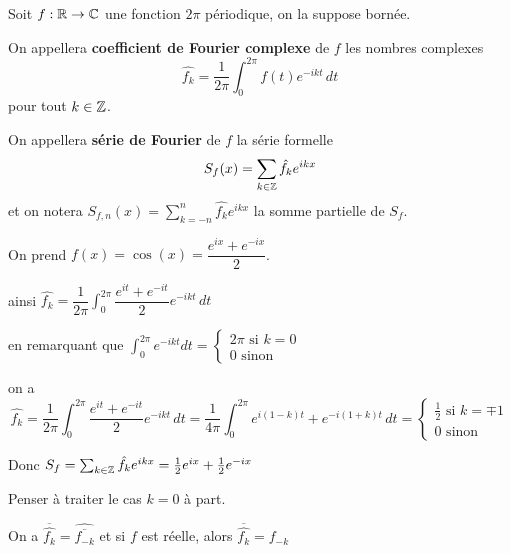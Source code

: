 \documentclass[a4paper,12pt]{article}
\begin{document}
\begin{definition}
    Soit $f : \mathbb{R} \to \mathbb{C}$ une fonction $2\pi$ périodique, on la suppose bornée.

    On appellera \textbf{coefficient de Fourier complexe} de $f$ les nombres complexes
    $$
    \hat{f_k} = \frac{1}{2\pi} \int_0^{2\pi} f(t) e^{-ikt} \, dt
    $$
    pour tout $k \in \mathbb{Z}$.
\end{definition}

\begin{definition}
    On appellera \textbf{série de Fourier} de $f$ la série formelle
    $$
    S_f(x) = \sum_{k \in \mathbb{Z}} \hat{f_k} e^{ikx}
    $$
    et on notera $S_{f,n}(x) = \sum\limits_{k = -n}^{n} \hat{f_k} e^{ikx}$ la somme partielle de $S_f$.
\end{definition}

\begin{exemple}
    On prend $f(x) = \cos(x) = \dfrac{e^{ix} + e^{-ix}}{2}$.

    ainsi $\hat{f_k} = \dfrac{1}{2\pi} \int_0^{2\pi} \dfrac{e^{it} + e^{-it}}{2} e^{-ikt} \, dt$

    en remarquant que $\int_0^{2\pi} e^{-ikt} dt = \begin{cases}
        2\pi \text{ si } k = 0 \\
        0 \text{ sinon}
    \end{cases}$

    on a
    $$
    \hat{f_k} = \dfrac{1}{2\pi} \int_0^{2\pi} \dfrac{e^{it} + e^{-it}}{2} e^{-ikt} \, dt = \dfrac{1}{4\pi} \int_0^{2\pi} e^{i(1 - k)t} + e^{-i(1 + k)t} \, dt = \begin{cases}
    \frac{1}{2} \text{ si } k = \mp 1\\
    0 \text{ sinon}
    \end{cases}
    $$

    Donc $S_f = \sum_{k \in \mathbb{Z}} \hat{f_k} e^{ikx} = \frac{1}{2} e^{ix} + \frac{1}{2} e^{-ix}$
\end{exemple}

\begin{remarque}
    Penser à traiter le cas $k = 0$ à part.
\end{remarque}

\begin{remarque}
    On a $\overline{\hat{f_k}} = \hat{\overline{f_{-k}}}$ et si $f$ est réelle, alors $\overline{\hat{f_k}} = f_{-k}$
\end{remarque}
\end{document}
